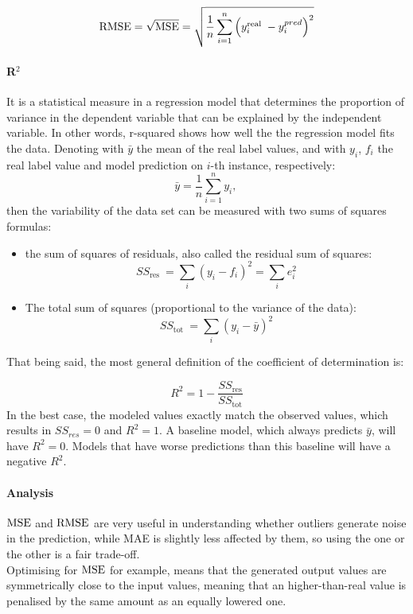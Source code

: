 $$
\operatorname{RMSE}=\sqrt{\operatorname{MSE}}=\sqrt{\frac{1}{n} \sum_{i=1}^{n}\left(y_{i}^{\text {real }}-y_{i}^{p r e d}\right)^{2}}
$$

\paragraph{R$^2$}
It is a statistical measure in a regression model that determines the proportion of variance in the dependent variable that can be explained by the independent variable. In other words, r-squared shows how well the the regression model fits the data.
Denoting with $\bar{y}$ the mean of the real label values, and with $y_i$, $f_i$ the real label value and model prediction on $i$-th instance, respectively:
$$
\bar{y}=\frac{1}{n} \sum_{i=1}^{n} y_{i} \text{, }
$$
then the variability of the data set can be measured with two sums of squares formulas:
\begin{itemize}
	\item the sum of squares of residuals, also called the residual sum of squares:
	$$
	S S_{\text {res }}=\sum_{i}\left(y_{i}-f_{i}\right)^{2}=\sum_{i} e_{i}^{2}
	$$
	
	\item The total sum of squares (proportional to the variance of the data):
	$$
	S S_{\text {tot }}=\sum_{i}\left(y_{i}-\bar{y}\right)^{2}
	$$
\end{itemize}
That being said, the most general definition of the coefficient of determination is:

$$
R^{2}=1-\frac{S S_{\mathrm{res}}}{S S_{\mathrm{tot}}}
$$
In the best case, the modeled values exactly match the observed values, which results in $SS_{res} = 0$ and $R^2 = 1$. A baseline model, which always predicts $\bar{y}$, will have $R^2 = 0$. Models that have worse predictions than this baseline will have a negative $R^2$.

\paragraph{Analysis}
$\operatorname{MSE}$ and $\operatorname{RMSE}$ are very useful in understanding whether outliers generate noise in the prediction, while MAE is slightly less affected by them, so using the one or the other is a fair trade-off.\\

Optimising for $\operatorname{MSE}$ for example, means that the generated output values are symmetrically close to the input values, meaning that an higher-than-real value is penalised by the same amount as an equally lowered one.

